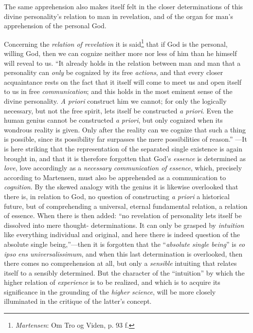 \documentclass[12pt,a4paper]{book}
\begin{document}
The same apprehension also makes itself felt in the closer determinations of this divine
personality's relation to man in revelation, and of the organ for man's apprehension of the
personal God.

Concerning the \emph{relation of revelation} it is said\footnote{\emph{Martensen}: Om Tro og Viden, p. 93
f.} that if God is the personal, willing God, then we can cognize neither more nor less of
him than he himself will reveal to us. ``It already holds in the relation between man and man
that a personality can \emph{only} be cognized by its free \emph{actions}, and that every
closer acquaintance rests on the fact that it itself will come to meet us and open itself to
us in free \emph{communication}; and this holds in the most eminent sense of the divine personality.
\textit{A priori} construct him we cannot; for only the logically necessary, but not the free
spirit, lets itself be constructed \textit{a priori}. Even the human genius cannot be
constructed \textit{a priori}, but only cognized when its wondrous reality is given. Only
after the reality can we cognize that such a thing is possible, since its possibility far
surpasses the mere possibilities of reason.'' ---It is here striking that the representation
of the separated single existence is again brought in, and that it is therefore forgotten
that God's \emph{essence} is determined as \emph{love}, love accordingly as a \emph{necessary communication of
essence}, which, precisely according to Martensen, must also be apprehended as a communication
to \emph{cognition}. By the skewed analogy with the genius it is likewise overlooked that there is,
in relation to God, no question of constructing \textit{a priori} a historical future, but of
comprehending a universal, eternal fundamental relation, a relation of essence. When there is
then added: ``no revelation of personality lets itself be dissolved into mere thought-
determinations. It can only be grasped by \emph{intuition} like everything individual and original,
and here there is indeed question of the absolute single being,''---then it is forgotten that
the ``\emph{absolute single being}'' is \textit{eo ipso} \textit{ens universalissimum}, and
when this last determination is overlooked, then there comes no comprehension at all, but only
a \emph{sensible} intuiting that relates itself to a sensibly determined. But the character of the
``intuition'' by which the higher relation of \emph{experience} is to be realized, and which is to
acquire its significance in the grounding of the \emph{higher science}, will be more closely
illuminated in the critique of the latter's concept.
\end{document}
